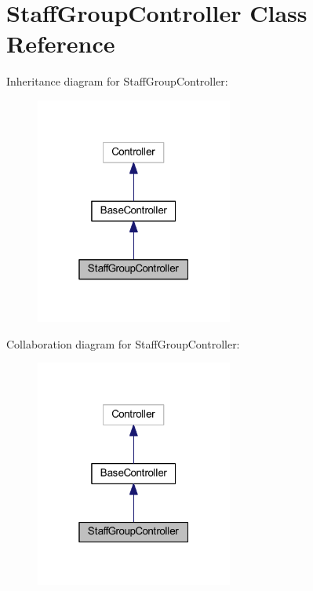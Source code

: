 \hypertarget{class_staff_group_controller}{}\section{Staff\+Group\+Controller Class Reference}
\label{class_staff_group_controller}


Inheritance diagram for Staff\+Group\+Controller\+:
\nopagebreak
\begin{figure}[H]
\begin{center}
\leavevmode
\includegraphics[width=184pt]{class_staff_group_controller__inherit__graph}
\end{center}
\end{figure}


Collaboration diagram for Staff\+Group\+Controller\+:
\nopagebreak
\begin{figure}[H]
\begin{center}
\leavevmode
\includegraphics[width=184pt]{class_staff_group_controller__coll__graph}
\end{center}
\end{figure}
